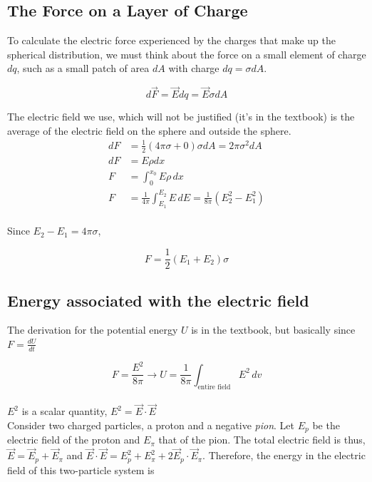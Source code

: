 \documentclass[svgnames]{article}
\begin{document}
\subsection{The Force on a Layer of Charge}

\vspace{20px}

To calculate the electric force experienced by the charges that make up the spherical distribution, we must think about the force on a small element of charge $dq$, such as a small patch of area $dA$ with charge $dq = \sigma dA$. 

\[ d\vec{F} = \vec{E} dq = \vec{E} \sigma dA \]

The electric field we use, which will not be justified (it's in the textbook) is the average of the electric field on the sphere and outside the sphere. \\ 
\begin{align*} 
 dF &= \frac{1}{2} (4\pi \sigma + 0)\sigma dA = 2\pi \sigma^2 dA\\
 dF &=  E \rho dx \\
 F &= \int_0^{x_0} E\rho \, dx \\
 F &= \frac{1}{4\pi} \int_{E_1}^{E_2} E \, dE = \frac{1}{8\pi} (E_2^2 - E_1^2)
 \end{align*} \\
 
 Since $E_2 - E_1 = 4\pi \sigma$, 
 
 \[ F = \frac{1}{2}(E_1 + E_2)\sigma \] 
 
 \subsection{Energy associated with the electric field} 
 
 The derivation for the potential energy $U$ is in the textbook, but basically since $F = \frac{dU}{dt}$
 
 \[ F = \frac{E^2}{8\pi} \rightarrow U = \frac{1}{8\pi} \int_\text{entire field} E^2 \, dv \] \\
 
 $E^2$ is a scalar quantity, $E^2 = \vec{E} \cdot \vec{E}$ \\
 
 Consider two charged particles, a proton and a negative \textit{pion}. Let $E_p$ be the electric field of the proton and $E_\pi$ that of the pion. The total electric field is thus, $\vec{E} = \vec{E}_p + \vec{E}_\pi$ and $\vec{E} \cdot \vec{E} = E_p^2 + E_\pi^2 + 2\vec{E}_p \cdot \vec{E}_\pi$. Therefore, the energy in the electric field of this two-particle system is 
 
\end{document}
